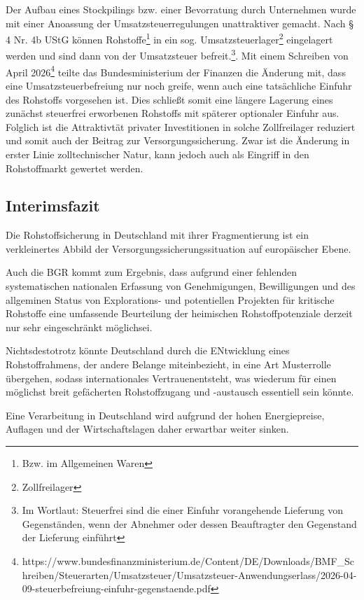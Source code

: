 \documentclass[12pt,a4paper,oneside]{book} %
\begin{document}
Der Aufbau eines Stockpilings bzw. einer Bevorratung durch Unternehmen wurde mit einer Anoassung der Umsatzsteuerregulungen unattraktiver gemacht. Nach § 4 Nr. 4b UStG können Rohstoffe\footnote{Bzw. im Allgemeinen Waren} in ein sog. Umsatzsteuerlager\footnote{Zollfreilager} eingelagert werden und sind dann von der Umsatzsteuer befreit.\footnote{Im Wortlaut: Steuerfrei sind \glqq die einer Einfuhr vorangehende Lieferung von Gegenständen, wenn der Abnehmer oder dessen Beauftragter den Gegenstand der Lieferung einführt\grqq}. Mit einem Schreiben von April 2026\footnote{https://www.bundesfinanzministerium.de/Content/DE/Downloads/BMF_Schreiben/Steuerarten/Umsatzsteuer/Umsatzsteuer-Anwendungserlass/2026-04-09-steuerbefreiung-einfuhr-gegenstaende.pdf} teilte das Bundesministerium der Finanzen die Änderung mit, dass eine Umsatzsteuerbefreiung nur noch greife, wenn auch eine tatsächliche Einfuhr des Rohstoffs vorgesehen ist. Dies schließt somit eine längere Lagerung eines zunächst steuerfrei erworbenen Rohstoffs mit späterer optionaler Einfuhr aus. Folglich ist die Attraktivtät privater Investitionen in solche Zollfreilager reduziert und somit auch der Beitrag zur Versorgungssicherung. Zwar ist die Änderung in erster Linie zolltechnischer Natur, kann jedoch auch als Eingriff in den Rohstoffmarkt gewertet werden.

\subsection{Interimsfazit}
Die Rohstoffsicherung in Deutschland mit ihrer Fragmentierung ist ein verkleinertes Abbild der Versorgungssicherungssituation auf europäischer Ebene.

Auch die BGR kommt zum Ergebnis, dass aufgrund einer fehlenden systematischen nationalen Erfassung von Genehmigungen, Bewilligungen und des allgeminen Status von Explorations- und potentiellen Projekten für kritische Rohstoffe \glqq eine umfassende Beurteilung der heimischen Rohstoffpotenziale derzeit nur sehr eingeschränkt möglich\grqq sei.\autocite{Top Commodity News 73, S. 14}

Nichtsdestotrotz könnte Deutschland durch die ENtwicklung eines Rohstoffrahmens, der andere Belange miteinbezieht, in eine Art Musterrolle übergehen, sodass \glqq internationales Vertrauen\grqq entsteht, was wiederum für einen möglichst breit gefächerten Rohstoffzugang und -austausch essentiell sein könnte.\autocite{Frenz 2025, S: 1039}

Eine Verarbeitung in Deutschland wird aufgrund der hohen Energiepreise, Auflagen und der Wirtschaftslagen daher erwartbar weiter sinken.\autocite{Frenz 2025, S. 97}
\end{document}
